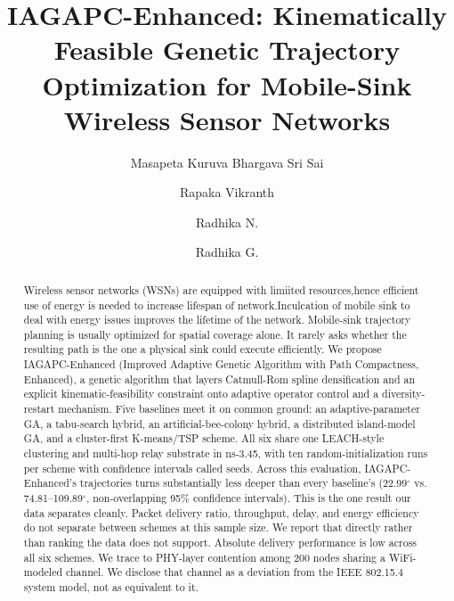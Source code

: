 \documentclass[runningheads]{llncs}
\begin{document}
\title{IAGAPC-Enhanced: Kinematically Feasible Genetic Trajectory Optimization for Mobile-Sink Wireless Sensor Networks}

\author{Masapeta Kuruva Bhargava Sri Sai \and Rapaka Vikranth \and Radhika N. \and Radhika G.}

\maketitle
\begin{abstract}
Wireless sensor networks (WSNs) are equipped with limiited resources,hence efficient use of energy is needed to increase lifespan of network.Inculcation of mobile sink to deal with energy issues improves the lifetime of the network. Mobile-sink
trajectory planning is usually optimized for spatial coverage alone. It
rarely asks whether the resulting path is the one a physical sink could execute
efficiently. We propose IAGAPC-Enhanced (Improved Adaptive Genetic
Algorithm with Path Compactness, Enhanced), a genetic algorithm that layers
Catmull-Rom spline densification and an explicit kinematic-feasibility
constraint onto adaptive operator control and a diversity-restart
mechanism. Five baselines meet it on common ground: an adaptive-parameter
GA, a tabu-search hybrid, an artificial-bee-colony hybrid, a distributed
island-model GA, and a cluster-first K-means/TSP scheme. All six share one
LEACH-style clustering and multi-hop relay substrate in ns-3.45, with ten
random-initialization runs per scheme with confidence intervals called seeds. Across this evaluation,
IAGAPC-Enhanced's trajectories turns substantially less deeper than every
baseline's (22.99$^\circ$ vs. 74.81--109.89$^\circ$, non-overlapping 95\%
confidence intervals). This is the one result our data separates cleanly.
Packet delivery ratio, throughput, delay, and energy efficiency do not
separate between schemes at this sample size. We report that directly
rather than  ranking the data does not support. Absolute delivery
performance is low across all six schemes. We trace to PHY-layer
contention among 200 nodes sharing a WiFi-modeled channel. We disclose that
channel as a deviation from the IEEE 802.15.4 system model, not as
equivalent to it.
\end{abstract}
\end{document}
